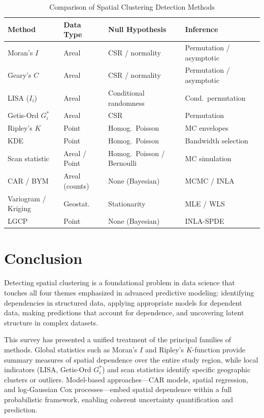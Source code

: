 \documentclass[conference]{IEEEtran}
\theoremstyle{definition}
\begin{document}
\begin{table}[!t]
\caption{Comparison of Spatial Clustering Detection Methods}
\label{tab:comparison}
\centering
\renewcommand{\arraystretch}{1.2}
\begin{tabular}{@{}p{2.1cm}p{1.4cm}p{1.8cm}p{1.5cm}@{}}
\toprule
Method & Data Type & Null Hypothesis & Inference \\
\midrule
Moran's $I$ & Areal & CSR / normality & Permutation / asymptotic \\
Geary's $C$ & Areal & CSR / normality & Permutation / asymptotic \\
LISA ($I_i$) & Areal & Conditional randomness & Cond.\ permutation \\
Getis-Ord $G_i^*$ & Areal & CSR & Permutation \\
Ripley's $K$ & Point & Homog.\ Poisson & MC envelopes \\
KDE & Point & Homog.\ Poisson & Bandwidth selection \\
Scan statistic & Areal / Point & Homog.\ Poisson / Bernoulli & MC simulation \\
CAR / BYM & Areal (counts) & None (Bayesian) & MCMC / INLA \\
Variogram / Kriging & Geostat.\ & Stationarity & MLE / WLS \\
LGCP & Point & None (Bayesian) & INLA-SPDE \\
\bottomrule
\end{tabular}
\end{table}

\section{Conclusion}
\label{sec:conclusion}

Detecting spatial clustering is a foundational problem in data science that touches all four themes emphasized in advanced predictive modeling: identifying dependencies in structured data, applying appropriate models for dependent data, making predictions that account for dependence, and uncovering latent structure in complex datasets.

This survey has presented a unified treatment of the principal families of methods. Global statistics such as Moran's $I$ and Ripley's $K$-function provide summary measures of spatial dependence over the entire study region, while local indicators (LISA, Getis-Ord $G_i^*$) and scan statistics identify specific geographic clusters or outliers. Model-based approaches---CAR models, spatial regression, and log-Gaussian Cox processes---embed spatial dependence within a full probabilistic framework, enabling coherent uncertainty quantification and prediction.
\end{document}
